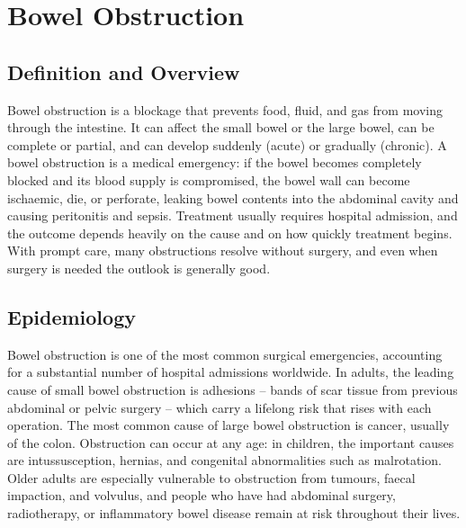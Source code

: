 \chapter{Bowel Obstruction}

\section*{Definition and Overview}
Bowel obstruction is a blockage that prevents food, fluid, and gas from moving through the intestine. It can affect the small bowel or the large bowel, can be complete or partial, and can develop suddenly (acute) or gradually (chronic). A bowel obstruction is a medical emergency: if the bowel becomes completely blocked and its blood supply is compromised, the bowel wall can become ischaemic, die, or perforate, leaking bowel contents into the abdominal cavity and causing peritonitis and sepsis. Treatment usually requires hospital admission, and the outcome depends heavily on the cause and on how quickly treatment begins. With prompt care, many obstructions resolve without surgery, and even when surgery is needed the outlook is generally good.

\section*{Epidemiology}
Bowel obstruction is one of the most common surgical emergencies, accounting for a substantial number of hospital admissions worldwide. In adults, the leading cause of small bowel obstruction is adhesions -- bands of scar tissue from previous abdominal or pelvic surgery -- which carry a lifelong risk that rises with each operation. The most common cause of large bowel obstruction is cancer, usually of the colon. Obstruction can occur at any age: in children, the important causes are intussusception, hernias, and congenital abnormalities such as malrotation. Older adults are especially vulnerable to obstruction from tumours, faecal impaction, and volvulus, and people who have had abdominal surgery, radiotherapy, or inflammatory bowel disease remain at risk throughout their lives.

